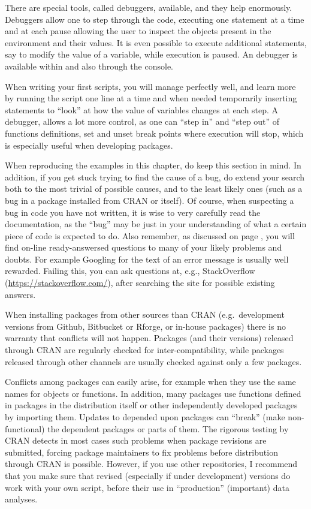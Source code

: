 \documentclass[krantz2]{krantz}\usepackage{knitr}%
\begin{document}
There are special tools, called debuggers, available, and they help enormously. Debuggers allow one to step through the code, executing one statement at a time and at each pause allowing the user to inspect the objects present in the \Rlang environment and their values. It is even possible to execute additional statements, say to modify the value of a variable, while execution is paused. An \Rlang debugger is available within \RStudio and also through the \Rlang console.

When writing your first scripts, you will manage perfectly well, and learn more by running the script one line at a time and when needed temporarily inserting  statements to ``look'' at how the value of variables changes at each step. A debugger, allows a lot more control, as one can ``step in'' and ``step out'' of functions definitions, set and unset break points where execution will stop, which is especially useful when developing \Rlang packages.

When reproducing the examples in this chapter, do keep this section in mind. In addition, if you get stuck trying to find the cause of a bug, do extend your search both to the most trivial of possible causes, and to the least likely ones (such as a bug in a package installed from CRAN or \Rlang itself). Of course, when suspecting a bug in code you have not written, it is wise to very carefully read the documentation, as the ``bug'' may be just in your understanding of what a certain piece of code is expected to do.  Also remember, as discussed on page \pageref{sec:getting:help}, you will find on-line ready-answersed questions to many of your likely problems and doubts. For example Googling for the text of an error message is usually well rewarded. Failing this, you can ask questions at, e.g., StackOverflow (\url{https://stackoverflow.com/}), after searching the site for possible existing answers.

\begin{warningbox}
When installing packages from other sources than CRAN (e.g.\ development versions from Github, Bitbucket or Rforge, or in-house packages) there is no warranty that conflicts will not happen. Packages (and their versions) released through CRAN are regularly checked for inter-compatibility, while packages released through other channels are usually checked against only a few packages.

Conflicts among packages can easily arise, for example when they use the same names for objects or functions. In addition, many packages use functions defined in packages in the \Rlang distribution itself or other independently developed packages by importing them. Updates to depended upon packages can ``break'' (make non-functional) the dependent packages or parts of them. The rigorous testing by CRAN detects in most cases such problems when package revisions are submitted, forcing package maintainers to fix problems before distribution through CRAN is possible. However, if you use other repositories, I recommend that you make sure that revised (especially if under development) versions do work with your own script, before their use in ``production'' (important) data analyses.
\end{warningbox}
\end{document}
